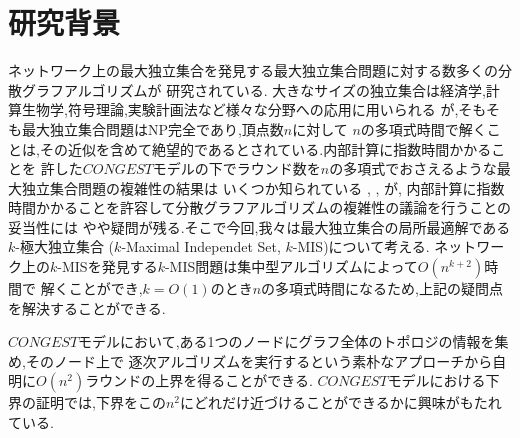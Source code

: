 \documentclass[12pt]{thesis}
\theoremstyle{definition}
\begin{document}
\section{研究背景}

ネットワーク上の最大独立集合を発見する最大独立集合問題に対する数多くの分散グラフアルゴリズムが
研究されている.
大きなサイズの独立集合は経済学,計算生物学,符号理論,実験計画法など様々な分野への応用に用いられる
\cite{kawarabayashi2019improved} が,そもそも最大独立集合問題はNP完全であり,頂点数$n$に対して
$n$の多項式時間で解くことは,その近似を含めて絶望的であるとされている.内部計算に指数時間かかることを
許した$CONGEST$モデルの下でラウンド数を$n$の多項式でおさえるような最大独立集合問題の複雑性の結果は
いくつか知られている \cite{kawarabayashi2019improved}, \cite{censor2017quadratic}, \cite{efron2020beyond}が,
内部計算に指数時間かかることを許容して分散グラフアルゴリズムの複雑性の議論を行うことの妥当性には
やや疑問が残る.そこで今回,我々は最大独立集合の局所最適解である$k$-極大独立集合
($k$-Maximal Independet Set, $k$-MIS)について考える.
ネットワーク上の$k$-MISを発見する$k$-MIS問題は集中型アルゴリズムによって$O(n^{k + 2})$時間で
解くことができ,$k = O(1)$のとき$n$の多項式時間になるため,上記の疑問点を解決することができる.

$CONGEST$モデルにおいて,ある1つのノードにグラフ全体のトポロジの情報を集め,そのノード上で
逐次アルゴリズムを実行するという素朴なアプローチから自明に$O (n^{2})$ラウンドの上界を得ることができる.
$CONGEST$モデルにおける下界の証明では,下界をこの$n^{2}$にどれだけ近づけることができるかに興味がもたれている.
\end{document}
